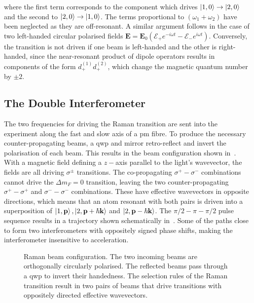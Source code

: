 where the first term corresponds to the component which drives
$\ket{1,0} \rightarrow \ket{2,0}$ and the second to $\ket{2,0}
\rightarrow \ket{1,0}$.
The terms proportional
to $(\omega_1 + \omega_2)$ have been neglected as they are
off-resonant. A similar argument follows in the case of two left-handed
circular polarised fields $\textbf{E} =
\textbf{E}_0\left(\mathcal{E}_+ e^{-i \omega t} - \mathcal{E}_-
e^{i \omega t}\right)$. Conversely, the transition is not driven if one beam
is left-handed and the other is right-handed, since the near-resonant product of dipole operators
results in components of the form $d^{(1)}_+ d^{(2)}_+$, which
change the magnetic quantum number by $\pm2$.
\subsection{The Double Interferometer}\label{sec:theory_double_int}
The two frequencies for driving the Raman transition are sent into the
experiment along the fast and slow axis of a \ac{pm} fibre. 
To produce the necessary counter-propagating beams, a \ac{qwp} and
mirror retro-reflect and invert the polarisation of each beam. This
results in the beam configuration shown in~.
With a magnetic field defining a $z-$axis parallel to the light's
wavevector, the fields are all driving $\sigma^\pm$ transitions. The
co-propagating $\sigma^+ - \sigma^-$ combinations cannot drive the
$\Delta m_F = 0$  transition, leaving the two
counter-propagating $\sigma^{+} - \sigma^{+}$ and $\sigma^{-} -
\sigma^{-}$ combinations. These have effective wavevectors in opposite
directions, which means that an atom resonant with both pairs is
driven into a superposition of $\ket{1,\textbf{p}},
  \ket{2,\textbf{p}+\hbar \textbf{k}}$ and  $\ket{2,\textbf{p}-\hbar
  \textbf{k}}$. The $\pi/2-\pi-\pi/2$ pulse sequence results in a trajectory shown schematically
  in~. Some of the paths close to
  form two interferometers with oppositely signed phase shifts, making
  the interferometer insensitive to acceleration.
\begin{figure}[htpb]
  \centering
  \resizebox{0.8\textwidth}{!}{}
  \caption[Raman beam configuration.]{Raman beam configuration. The two incoming beams are
  orthogonally circularly polarised. The reflected beams pass through
a \ac{qwp} to invert their handedness. The selection rules of the
Raman transition result in two pairs of beams that drive transitions
with oppositely directed effective wavevectors.}
  \label{fig:double_int}
\end{figure}
